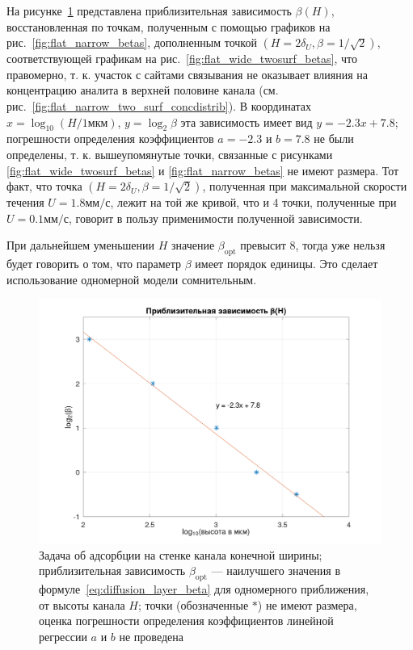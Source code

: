 \documentclass[oneside,final,12pt]{extreport}
\begin{document}
На рисунке~\ref{fig:flat_narrow_beta_height} представлена
приблизительная зависимость $\beta\left(H\right)$, восстановленная по точкам,
полученным с помощью графиков на рис.~\ref{fig:flat_narrow_betas},
дополненным точкой $\left(H = 2\delta_U, \beta = 1/\sqrt{2}\right)$,
соответствующей графикам на рис.~\ref{fig:flat_wide_twosurf_betas},
что правомерно, т. к. участок с сайтами связывания не оказывает влияния
на концентрацию аналита в верхней половине канала
(см. рис.~\ref{fig:flat_narrow_two_surf_concdistrib}).
В координатах $x = \log_{10}{\left(H/1\text{мкм}\right)}$, $y = \log_{2}{\beta}$
эта зависимость имеет вид $y = -2.3x + 7.8$;
погрешности определения коэффициентов $a = -2.3$ и $b = 7.8$
не были определены, т. к. вышеупомянутые точки,
связанные с рисунками \ref{fig:flat_wide_twosurf_betas} и \ref{fig:flat_narrow_betas}
не имеют размера.
Тот факт, что точка $\left(H = 2\delta_U, \beta = 1/\sqrt{2}\right)$,
полученная при максимальной скорости течения $U = 1.8\text{мм}/\text{с}$,
лежит на той же кривой, что и 4 точки, полученные при $U = 0.1\text{мм}/\text{с}$,
говорит в пользу применимости полученной зависимости.

При дальнейшем уменьшении $H$ значение $\beta_\text{opt}$ превысит $8$,
тогда уже нельзя будет говорить о том, что параметр $\beta$ имеет порядок единицы.
Это сделает использование одномерной модели сомнительным.

\begin{figure}
  \centering
  \includegraphics[width=.8\textwidth]{pic/flat_narrow_beta_height}

  \caption{%
    \label{fig:flat_narrow_beta_height}%
    Задача об адсорбции на стенке канала конечной ширины;
    приблизительная зависимость
    $\beta_\text{opt}$ --- наилучшего значения в формуле~\eqref{eq:diffusion_layer_beta}
    для одномерного приближения, от высоты канала $H$;
    точки (обозначенные $*$) не имеют размера,
    оценка погрешности определения коэффициентов
    линейной регрессии $a$ и $b$ не проведена
  }

\end{figure}
\end{document}

